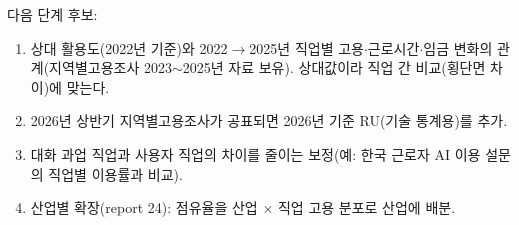 \documentclass[11pt]{article}
\begin{document}
다음 단계 후보:
\begin{enumerate}[leftmargin=*]
  \item 상대 활용도(2022년 기준)와 2022$\to$2025년 직업별 고용$\cdot$근로시간$\cdot$임금 변화의 관계(지역별고용조사 2023$\sim$2025년 자료 보유). 상대값이라 직업 간 비교(횡단면 차이)에 맞는다.
  \item 2026년 상반기 지역별고용조사가 공표되면 2026년 기준 RU(기술 통계용)를 추가.
  \item 대화 과업 직업과 사용자 직업의 차이를 줄이는 보정(예: 한국 근로자 AI 이용 설문의 직업별 이용률과 비교).
  \item 산업별 확장(report 24): 점유율을 산업 $\times$ 직업 고용 분포로 산업에 배분.
\end{enumerate}
\end{document}
